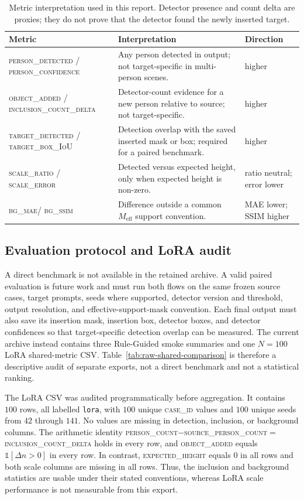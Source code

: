\documentclass[11pt,a4paper]{article}
\newcommand{\bgmae}{\textsc{bg\_mae}\xspace}
\newcommand{\bgssim}{\textsc{bg\_ssim}\xspace}
\begin{document}
\begin{table}[t]
  \centering
  \caption[Metric interpretation]{Metric interpretation used in this report.
  Detector presence and count delta are proxies; they do not prove that the
  detector found the newly inserted target.}
  \label{tab:shared-metrics}
  \small
  \begin{tabular}{@{}p{3.6cm}p{5.2cm}p{1.6cm}@{}}
    \toprule
    Metric & Interpretation & Direction \\
    \midrule
    \textsc{person\_detected} / \textsc{person\_confidence} & Any person detected in output; not target-specific in multi-person scenes. & higher \\
    \textsc{object\_added} / \textsc{inclusion\_count\_delta} & Detector-count evidence for a new person relative to source; not target-specific. & higher \\
    \textsc{target\_detected} / \textsc{target\_box\_IoU} & Detection overlap with the saved inserted mask or box; required for a paired benchmark. & higher \\
    \textsc{scale\_ratio} / \textsc{scale\_error} & Detected versus expected height, only when expected height is non-zero. & ratio neutral; error lower \\
    \bgmae / \bgssim & Difference outside a common $M_{\mathrm{eff}}$ support convention. & MAE lower; SSIM higher \\
    \bottomrule
  \end{tabular}
\end{table}

\subsection{Evaluation protocol and LoRA audit}\label{sec:protocol}
A direct benchmark is not available in the retained archive. A valid paired evaluation is future work and must run both flows on the same frozen source cases, target prompts, seeds where supported, detector version and threshold, output resolution, and effective-support-mask convention. Each final output must also save its insertion mask, insertion box, detector boxes, and detector confidences so that target-specific detection overlap can be measured. The current archive instead contains three Rule-Guided smoke summaries and one $N=100$ LoRA shared-metric CSV. Table~\ref{tab:raw-shared-comparison} is therefore a descriptive audit of separate exports, not a direct benchmark and not a statistical ranking.

The LoRA CSV was audited programmatically before aggregation. It contains $100$
rows, all labelled \texttt{lora}, with $100$ unique \textsc{case\_id} values and
$100$ unique seeds from $42$ through $141$. No values are missing in detection,
inclusion, or background columns. The arithmetic identity
\textsc{person\_count}$-$\textsc{source\_person\_count}$=$\textsc{inclusion\_count\_delta}
holds in every row, and \textsc{object\_added} equals $\mathbb{1}[\Delta n>0]$ in
every row. In contrast, \textsc{expected\_height} equals $0$ in all rows and both
scale columns are missing in all rows. Thus, the inclusion and background statistics
are usable under their stated conventions, whereas LoRA scale performance is not
measurable from this export.
\end{document}
